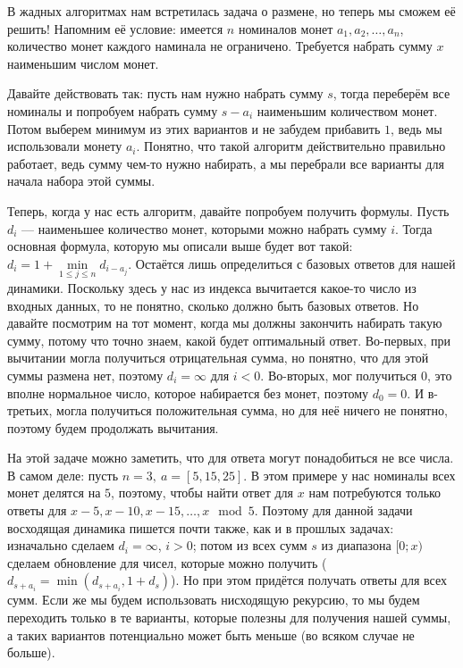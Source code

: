 В жадных алгоритмах нам встретилась задача о размене, но теперь мы сможем её решить! Напомним её условие: имеется $n$ номиналов монет $a_1, a_2, \ldots, a_n$, количество монет каждого наминала не ограничено. Требуется набрать сумму $x$ наименьшим числом монет.

Давайте действовать так: пусть нам нужно набрать сумму $s$, тогда переберём все номиналы и попробуем набрать сумму $s - a_i$ наименьшим количеством монет. Потом выберем минимум из этих вариантов и не забудем прибавить $1$, ведь мы использовали монету $a_i$. Понятно, что такой алгоритм действительно правильно работает, ведь сумму чем-то нужно набирать, а мы перебрали все варианты для начала набора этой суммы.

Теперь, когда у нас есть алгоритм, давайте попробуем получить формулы. Пусть $d_i$ — наименьшее количество монет, которыми можно набрать сумму $i$. Тогда основная формула, которую мы описали выше будет вот такой: $d_i = 1 + \min\limits_{1 \leq j \leq n} d_{i - a_j}$. Остаётся лишь определиться с базовых ответов для нашей динамики. Поскольку здесь у нас из индекса вычитается какое-то число из входных данных, то не понятно, сколько должно быть базовых ответов. Но давайте посмотрим на тот момент, когда мы должны закончить набирать такую сумму, потому что точно знаем, какой будет оптимальный ответ. Во-первых, при вычитании могла получиться отрицательная сумма, но понятно, что для этой суммы размена нет, поэтому $d_i = \infty$ для $i < 0$. Во-вторых, мог получиться 0, это вполне нормальное число, которое набирается без монет, поэтому $d_0 = 0$. И в-третьих, могла получиться положительная сумма, но для неё ничего не понятно, поэтому будем продолжать вычитания.

На этой задаче можно заметить, что для ответа могут понадобиться не все числа. В самом деле: пусть $n = 3,\ a = [5, 15, 25]$. В этом примере у нас номиналы всех монет делятся на $5$, поэтому, чтобы найти ответ для $x$ нам потребуются только ответы для $x - 5, x - 10, x - 15, \ldots, x \mod 5$. Поэтому для данной задачи восходящая динамика пишется почти также, как и в прошлых задачах: изначально сделаем $d_i = \infty$, $i > 0$; потом из всех сумм $s$ из диапазона $[0; x)$ сделаем обновление для чисел, которые можно получить ($d_{s + a_i} = \min( d_{s + a_i}, 1 + d_{s} )$). Но при этом придётся получать ответы для всех сумм. Если же мы будем использовать нисходящую рекурсию, то мы будем переходить только в те варианты, которые полезны для получения нашей суммы, а таких вариантов потенциально может быть меньше (во всяком случае не больше).

